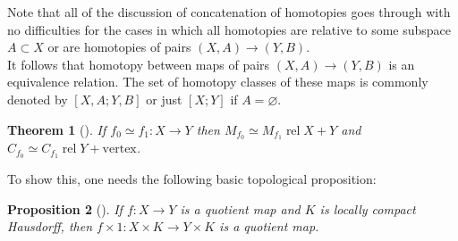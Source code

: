 \documentclass[reqno]{amsart}
\newtheorem{theorem}{Theorem}[section]
\newtheorem{proposition}[theorem]{Proposition}
\theoremstyle{definition}
\theoremstyle{remark}
\DeclareMathOperator{\rel}{rel}
\begin{document}
Note that all of the discussion of concatenation of
homotopies goes through with no difficulties for the cases
in which all homotopies are relative to some subspace
$A \subset X$ or are homotopies of pairs
$\left( X, A  \right) \to \left( Y, B \right) $.\\
It follows that homotopy between maps of
pairs $\left( X,A \right) \to \left( Y,B \right) $ is
an equivalence relation. The set of homotopy classes
of these maps is commonly denoted by
$\left[ X,A ; Y ,B \right] $ or just
$\left[ X;Y \right] $ if $A = \varnothing$.

\begin{theorem}[]\label{Thm:299221}
    If $f_0 \simeq f_1 \colon X \to Y$ then
    $M_{f_0} \simeq M_{f_1} \rel
    X + Y$ and
    $C_{f_0} \simeq C_{f_1} \rel
    Y + \text{vertex}$.
\end{theorem}


To show this, one needs the following basic topological
proposition:
\begin{proposition}[] \label{prop:92031999}
    If $f \colon X \to Y$ is a quotient map and
    $K$ is locally compact Hausdorff, then
    $f \times 1 \colon X \times K \to Y \times K$ is
    a quotient map.
\end{proposition}
\end{document}
